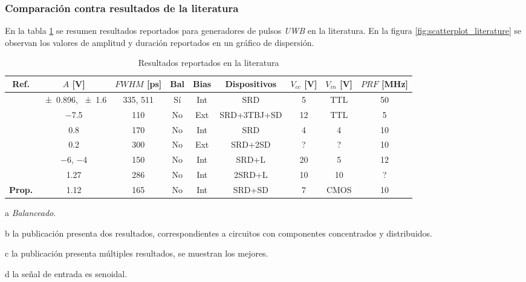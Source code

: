 \subsubsection{Comparación contra resultados de la literatura}

En la tabla \ref{tab:resultados_literatura} se resumen resultados reportados
para generadores de pulsos \textit{UWB} en la literatura. En la figura
\ref{fig:scatterplot_literature} se observan los valores de amplitud y duración
reportados en un gráfico de dispersión.

\begin{table}[t!]
    \begin{threeparttable}[b]
        {\footnotesize
            \begin{tabular}{ccccccccc}
                \hline
                Ref. & $A$ [\unit{\volt}] & $FWHM$ [\unit{\pico\second}] &
                Bal \tnote{a} & Bias & Dispositivos & $V_{cc}$ [\unit{\volt}] & $V_{in}$ [\unit{\volt}] & $PRF$ [\unit{\mega\hertz}] \\
                \hline
                \cite{rulikowski2004} & \num{\pm 0.896}, \num{\pm 1.6} \tnote{b} & 335, 511 & Sí & Int & SRD & 5 & TTL & 50 \\
                \cite{protiva2009} & \num{-7.5} & 110 & No & Ext & SRD+3TBJ+SD & 12 & TTL & 5 \\
                \cite{kamal2014} & \num{0.8} & 170 & No & Int & SRD & 4 & 4 & 10 \\
                \cite{han2002} & \num{0.2} & 300 & No & Ext & SRD+2SD & ? & ? & 10 \\
                \cite{han2005} & \num{-6}, \num{-4} & 150 & No & Int & SRD+L & 20 & 5 & 12 \\
                \cite{oloumi2018} & \num{1.27} \tnote{c} & 286 & No & Int & 2SRD+L & 10 & 10 \tnote{d} & ? \\
                \textbf{Prop.} & \num{1.12} & 165 & No & Int & SRD+SD & 7 & CMOS  &
                \num{10} \\
            \end{tabular}
        }
        \begin{tablenotes}
            \item [a] \textit{Balanceado}.
            \item [b] la publicación presenta dos resultados, correspondientes a
            circuitos con componentes concentrados y distribuidos.
            \item [c] la publicación presenta múltiples resultados, se muestran
            los mejores.
            \item [d] la señal de entrada es senoidal.
        \end{tablenotes}
    \end{threeparttable}
    \caption{Resultados reportados en la literatura}
    \label{tab:resultados_literatura}
\end{table}

